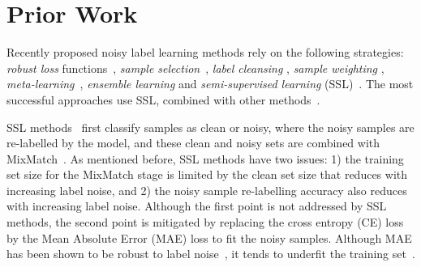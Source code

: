 \documentclass{bmvc2k}
\begin{document}
\vspace{-.1in}
\section{Prior Work}

Recently proposed noisy label learning methods rely on the following strategies: \textit{robust loss} functions~\citep{ma2020normalized,wang2019imae, wang2019symmetric}, \textit{sample selection}~\citep{han2018co}, \textit{label cleansing} \cite{jaehwan2019photometric, yuan2018iterative}, \textit{sample weighting} \cite{ren2018learning}, \textit{meta-learning}~\citep{han2018pumpout}, \textit{ensemble learning} \cite{miao2015rboost} and \textit{semi-supervised learning} (SSL)~\citep{MixMatch}. 
The most successful approaches use SSL, combined with other methods~\citep{jiang2018mentornet,DivideMix,elr2020}.

SSL methods~\citep{DivideMix,ortego2019towards} first classify samples as clean or noisy, where the noisy samples are re-labelled by the model, and these clean and noisy sets are combined with MixMatch~\citep{MixMatch}.
As mentioned before, SSL methods have two issues:
1) the training set size for the MixMatch stage is limited by the clean set size that reduces with increasing label noise, and 2) the noisy sample re-labelling accuracy also reduces with increasing label noise. 
Although the first point is not addressed by SSL methods, the second point is mitigated by replacing the cross entropy (CE) loss by the Mean Absolute Error (MAE) loss to fit the noisy samples.
Although MAE has been shown to be robust to label noise~\citep{ghosh2017robust}, it tends to underfit the training set~\citep{ma2020normalized}. 
\end{document}

